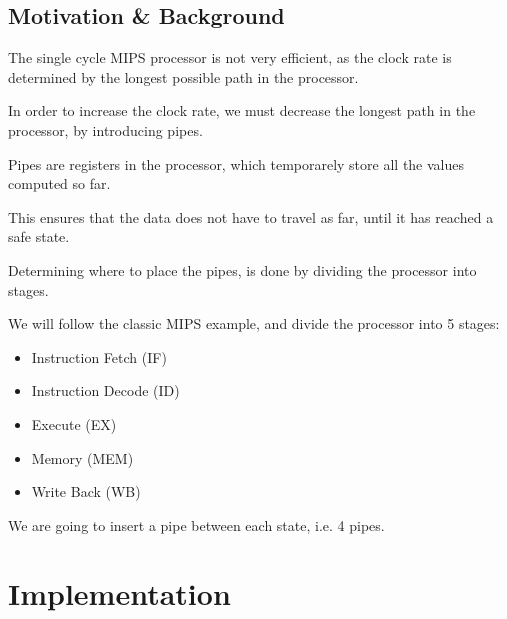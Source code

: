 \documentclass{beamer}
\begin{document}
\subsection{Motivation \& Background}
\begin{frame}
    The single cycle MIPS processor is not very efficient, as the clock rate is
    determined by the longest possible path in the processor.

    \vspace{\baselineskip}
    In order to increase the clock rate, we must decrease the longest path in
    the processor, by introducing pipes.
\end{frame}
\begin{frame}
    Pipes are registers in the processor, which temporarely store all the
    values computed so far.

    \vspace{\baselineskip}
    This ensures that the data does not have to travel as far, until it has
    reached a safe state.
\end{frame}
\begin{frame}
    Determining where to place the pipes, is done by dividing the processor
    into stages.

    \vspace{\baselineskip}
    We will follow the classic MIPS example, and divide the processor into 5
    stages:
    \begin{itemize}
        \item Instruction Fetch (IF)
        \item Instruction Decode (ID)
        \item Execute (EX)
        \item Memory (MEM)
        \item Write Back (WB)
    \end{itemize}
    We are going to insert a pipe between each state, i.e. 4 pipes.
\end{frame}

\section{Implementation}
\end{document}
